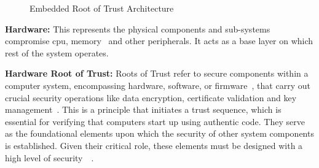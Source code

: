 \begin{figure}[H]
    \centering
    {}
    \caption{Embedded Root of Trust Architecture\cite{Introduc82:online}}\label{fig:rot}
\end{figure}




\textbf{Hardware:} This represents the physical components and sub-systems compromise
\gls{cpu}, memory~\cite{WhatisCo30:online} and other peripherals. It acts as a base layer on which
rest of the system operates.

\textbf{Hardware Root of Trust:} Roots of Trust refer to secure components within a computer system,
encompassing hardware, software, or firmware~\cite{WhatIsFi49:online}, that carry out crucial
security operations like data encryption, certificate validation and key management~\cite{RootofTr86:online}.
This is a principle that initiates a trust sequence, which is essential for verifying that
computers start up using authentic code. They serve as the foundational elements upon which the
security of other system components is established. Given their critical role, these elements must
be designed with a high level of
security~\cite{WhatisRo39:online}~\cite{RootofTr86:online}.

